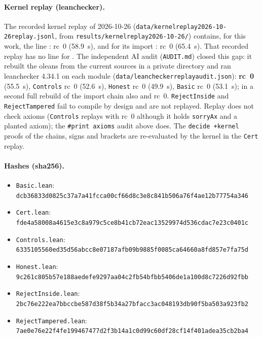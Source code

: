 \documentclass[10pt]{article}
\newcommand{\lean}[1]{\texttt{#1}}
\renewcommand{\_}{\textunderscore\penalty0\hspace{0pt}}
\begin{document}
\paragraph{Kernel replay (leanchecker).} The recorded kernel replay of 2026-10-26 (\texttt{data/kernel\_replay\_2026-10-26\_replay.jsonl}, from \texttt{results/kernel\_replay\_2026-10-26/}) contains, for this work, the line : rc~0 (58.9~s), and for its import : rc~0 (65.4~s). That recorded replay has no line for . The independent AI audit (\texttt{AUDIT.md}) closed this gap: it rebuilt the oleans from the current sources in a private directory and ran leanchecker 4.34.1 on each module (\texttt{data/leanchecker\_replay\_audit.json}):  \textbf{rc~0} (55.5~s), \texttt{Controls} rc~0 (52.6~s), \texttt{Honest} rc~0 (49.9~s), \texttt{Basic} rc~0 (53.1~s); in a second full rebuild of the import chain also  and  rc~0. \texttt{RejectInside} and \texttt{RejectTampered} fail to compile by design and are not replayed. Replay does not check axioms (\texttt{Controls} replays with rc~0 although it holds \lean{sorryAx} and a planted axiom); the \lean{\#print axioms} audit above does. The \lean{decide +kernel} proofs of the chains, signs and brackets are re-evaluated by the kernel in the \texttt{Cert} replay.
\paragraph{Hashes (sha256).}
\begin{itemize}\scriptsize\itemsep=0pt
\item \texttt{Basic.lean}: \texttt{dcb36833d0825c37a7a41fcca00cf66d8c3e8c841b506a76f4ae12b77754a346}
\item \texttt{Cert.lean}: \texttt{fde4a58008a4615e3c8a979c5ce8b41cb72eac13529974d536cdac7e23c0401c}
\item \texttt{Controls.lean}: \texttt{6335105560ed35d56abcc8e07187afb09b9885f0085ca64660a8fd857e7fa75d}
\item \texttt{Honest.lean}: \texttt{9c261c805b57e188aedefe9297aa04c2fb54bfbb5406de1a100d8c7226d92fbb}
\item \texttt{RejectInside.lean}: \texttt{2bc76e222ea7bbccbe587d38f5b34a27bfacc3ac048193db90f5ba503a923fb2}
\item \texttt{RejectTampered.lean}: \texttt{7ae0e76e22f4fe199467477d2f3b14a1c0d99c60df28cf14f401adea35cb2ba4}
\end{itemize}
\end{document}
